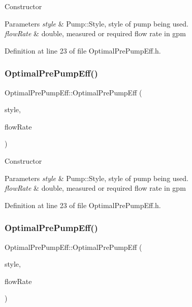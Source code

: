 Constructor 
\begin{DoxyParams}{Parameters}
{\em style} & Pump\+::\+Style, style of pump being used. \\
\hline
{\em flow\+Rate} & double, measured or required flow rate in gpm \\
\hline
\end{DoxyParams}


Definition at line 23 of file Optimal\+Pre\+Pump\+Eff.\+h.

\mbox{\label{class_optimal_pre_pump_eff_acd025ad710fbc57a548ae3343752ad6d}} 
\subsubsection{\texorpdfstring{Optimal\+Pre\+Pump\+Eff()}{OptimalPrePumpEff()}\hspace{0.1cm}{\footnotesize\ttfamily [2/3]}}
{\footnotesize\ttfamily Optimal\+Pre\+Pump\+Eff\+::\+Optimal\+Pre\+Pump\+Eff (\begin{DoxyParamCaption}\item[{const Pump\+::\+Style}]{style,  }\item[{const double}]{flow\+Rate }\end{DoxyParamCaption})\hspace{0.3cm}{\ttfamily [inline]}}

Constructor 
\begin{DoxyParams}{Parameters}
{\em style} & Pump\+::\+Style, style of pump being used. \\
\hline
{\em flow\+Rate} & double, measured or required flow rate in gpm \\
\hline
\end{DoxyParams}


Definition at line 23 of file Optimal\+Pre\+Pump\+Eff.\+h.

\mbox{\label{class_optimal_pre_pump_eff_acd025ad710fbc57a548ae3343752ad6d}} 
\subsubsection{\texorpdfstring{Optimal\+Pre\+Pump\+Eff()}{OptimalPrePumpEff()}\hspace{0.1cm}{\footnotesize\ttfamily [3/3]}}
{\footnotesize\ttfamily Optimal\+Pre\+Pump\+Eff\+::\+Optimal\+Pre\+Pump\+Eff (\begin{DoxyParamCaption}\item[{const Pump\+::\+Style}]{style,  }\item[{const double}]{flow\+Rate }\end{DoxyParamCaption})\hspace{0.3cm}{\ttfamily [inline]}}

